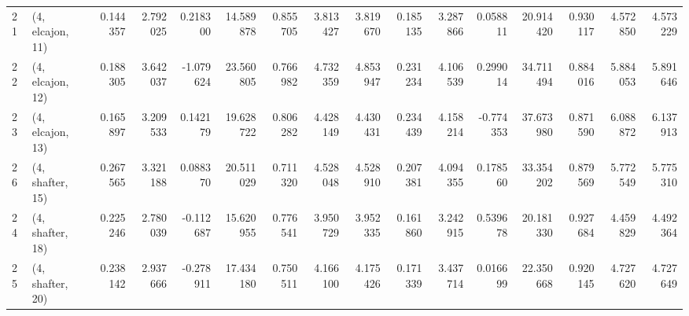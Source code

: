 \begin{tabular}{llrrrrrrrrrrrrrr}
21 &  (4, elcajon, 11) &   0.144357 &  2.792025 &  0.218300 &  14.589878 &  0.855705 &   3.813427 &  3.819670 &  0.185135 &  3.287866 &  0.058811 &   20.914420 &  0.930117 &   4.572850 &   4.573229 \\
22 &  (4, elcajon, 12) &   0.188305 &  3.642037 & -1.079624 &  23.560805 &  0.766982 &   4.732359 &  4.853947 &  0.231234 &  4.106539 &  0.299014 &   34.711494 &  0.884016 &   5.884053 &   5.891646 \\
23 &  (4, elcajon, 13) &   0.165897 &  3.209533 &  0.142179 &  19.628722 &  0.806282 &   4.428149 &  4.430431 &  0.234439 &  4.158214 & -0.774353 &   37.673980 &  0.871590 &   6.088872 &   6.137913 \\
26 &  (4, shafter, 15) &   0.267565 &  3.321188 &  0.088370 &  20.511029 &  0.711320 &   4.528048 &  4.528910 &  0.207381 &  4.094355 &  0.178560 &   33.354202 &  0.879569 &   5.772549 &   5.775310 \\
24 &  (4, shafter, 18) &   0.225246 &  2.780039 & -0.112687 &  15.620955 &  0.776541 &   3.950729 &  3.952335 &  0.161860 &  3.242915 &  0.539678 &   20.181330 &  0.927684 &   4.459829 &   4.492364 \\
25 &  (4, shafter, 20) &   0.238142 &  2.937666 & -0.278911 &  17.434180 &  0.750511 &   4.166100 &  4.175426 &  0.171339 &  3.437714 &  0.016699 &   22.350668 &  0.920145 &   4.727620 &   4.727649 \\
\bottomrule
\end{tabular}
